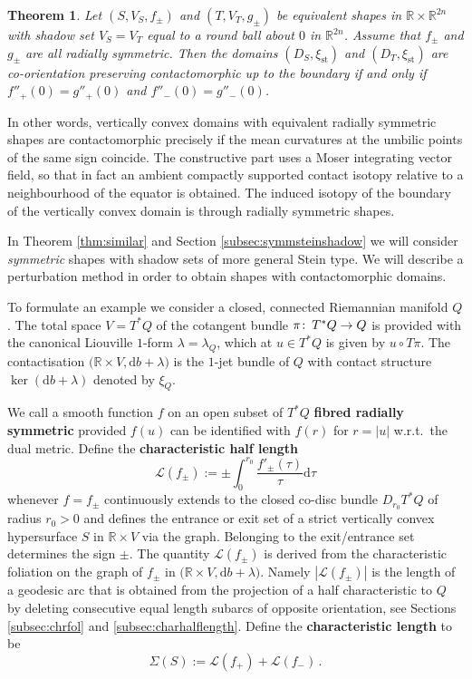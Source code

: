 \documentclass{amsart}
\newtheorem{thmintr}{Theorem}
\theoremstyle{definition}
\def\co{\colon\thinspace}
\newcommand{\rmd}{\mathrm d}
\newcommand{\LLL}{\mathscr L}
\newcommand{\R}{\mathbb R}
\newcommand{\ra}{\rightarrow}
\DeclareMathOperator{\st}{\mathrm{st}}
\begin{document}
\begin{thmintr}
\label{thmintr:contactbodies}
Let $(S,V_S,f_{\pm})$ and $(T,V_T,g_{\pm})$
be equivalent shapes in $\R\times\R^{2n}$
with shadow set $V_S=V_T$
equal to a round ball about $0$ in $\R^{2n}$.
Assume that $f_{\pm}$ and $g_{\pm}$ are all radially symmetric. 
Then the domains $(D_S,\xi_{\st})$ and $(D_T,\xi_{\st})$
are co-orientation preserving contactomorphic up to the boundary
if and only if $f''_+(0)=g''_+(0)$ and $f''_-(0)=g''_-(0)$.
\end{thmintr}


In other words,
vertically convex domains
with equivalent radially symmetric shapes are contactomorphic
precisely if the mean curvatures at the umbilic points of the same sign
coincide.
The constructive part uses a Moser integrating vector field,
so that in fact
an ambient compactly supported
contact isotopy relative to
a neighbourhood of the equator is obtained.
The induced isotopy of the boundary of the vertically convex domain
is through radially symmetric shapes.

In Theorem \ref{thm:similar} and Section \ref{subsec:symmsteinshadow}
we will consider {\it symmetric} shapes
with shadow sets of more general Stein type.
We will describe a perturbation method
in order to obtain shapes with contactomorphic domains.

To formulate an example we consider
a closed, connected Riemannian manifold $Q$.
The total space $V=T^*Q$ of the cotangent bundle $\pi\co T^*Q\ra Q$
is provided with the canonical Liouville $1$-form
$\lambda=\lambda_Q$,
which at $u\in T^*Q$ is given by $u\circ T\pi$.
The contactisation 
$\big(\R\times V,\rmd b+\lambda\big)$
is the $1$-jet bundle of $Q$ with
contact structure $\ker(\rmd b+\lambda)$
denoted by $\xi_Q$.

We call a smooth function $f$ on an open subset of $T^*Q$
{\bf fibred radially symmetric} provided
$f(u)$ can be identified with $f(r)$ for $r=|u|$
w.r.t.\ the dual metric.
Define the {\bf characteristic half length}
\[
\LLL(f_{\pm}):=
\pm\int_0^{r_0}
          \frac{f'_{\pm}(\tau)}{\tau}
\rmd\tau
\]
whenever $f=f_{\pm}$
continuously extends to the closed co-disc bundle
$D_{r_0}T^*Q$ of radius $r_0>0$
and defines the entrance or exit set
of a strict vertically convex hypersurface $S$
in $\R\times V$ via the graph.
Belonging to the exit/entrance set
determines the sign $\pm$.
The quantity $\LLL(f_{\pm})$
is derived from the characteristic foliation
on the graph of $f_{\pm}$
in $\big(\R\times V,\rmd b+\lambda\big)$.
Namely $|\LLL(f_{\pm})|$
is the length of a geodesic arc
that is obtained from
the projection of a half characteristic to $Q$
by deleting consecutive equal length subarcs
of opposite orientation,
see Sections \ref{subsec:chrfol} and
\ref{subsec:charhalflength}.
Define the {\bf characteristic length} to be
\[
\Sigma(S):=
\LLL(f_+)+\LLL(f_-)
\,.
\]
\end{document}
